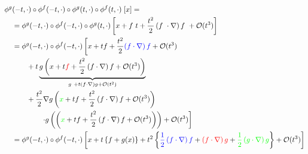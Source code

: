 \begin{equation*}
  \begin{aligned}
    \phi^g & (-t,\cdot)  \circ \phi^f(-t,\cdot) \circ \phi^g(t,\cdot) \circ \phi^f(t,\cdot) \; [x] =                                                                                                                                                                                                                                                                         \\
           & = \phi^g(-t,\cdot) \circ \phi^f(-t,\cdot) \circ \phi^g(t,\cdot) \left[ x +  f\ t + \frac{t^2}{2} \left( f\ \cdot \nabla \right) f\  + \mathcal O(t^3) \right]                                                                                                                                                                                                   \\
           & =  \phi^g(-t,\cdot) \circ \phi^f(-t,\cdot) \left[ x +  t f + \frac{t^2}{2} \textcolor{blue}{\left( f \cdot \nabla\right) f}  + \mathcal O(t^3) \right.                                                                                                                                                                                                          \\
           & \qquad + t \underbrace{g \left( x +  t \textcolor{red}{f} + \frac{t^2}{2} \left( f \cdot \nabla\right) f  + \mathcal O(t^3) \right)}_{g\ + t (f \cdot \nabla) g + \mathcal O(t^2)}                                                                                                                                                                              \\
           & \qquad + \frac{t^2}{2} \nabla g \left( \textcolor{green}{x} + t f + \frac{t^2}{2} \left( f \cdot \nabla\right) f  + \mathcal O(t^3) \right)                                                                                                                                                                                                                     \\
           & \left. \qquad \qquad \cdot g \left(\left( \textcolor{green}{x} + t f + \frac{t^2}{2} \left( f \cdot \nabla\right) f  + \mathcal O(t^3) \right) \right) + \mathcal O(t^3) \right]                                                                                                                                                                                \\
           & = \phi^g(-t,\cdot) \circ \phi^f(-t,\cdot) \left[ x + t \left\{ f + g(x) \right\} + t^2 \left\{ \textcolor{blue}{\frac{1}{2} \left( f \cdot \nabla\right) f} + \textcolor{red}{ \left( f \cdot \nabla \right) g} + \textcolor{green}{\frac{1}{2} \left( g \cdot \nabla \right) g }  \right\} + \mathcal O(t^3) \right]                                           \\

\end{aligned}
\end{equation*}
